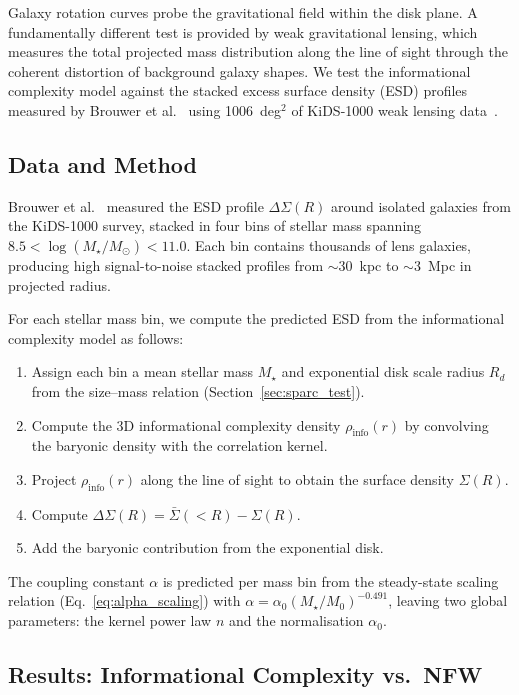 \documentclass[12pt,a4paper]{article}
\begin{document}
Galaxy rotation curves probe the gravitational field within the disk plane. A fundamentally different test is provided by weak gravitational lensing, which measures the total projected mass distribution along the line of sight through the coherent distortion of background galaxy shapes. We test the informational complexity model against the stacked excess surface density (ESD) profiles measured by Brouwer et al.~\cite{Brouwer2021} using 1006~deg$^2$ of KiDS-1000 weak lensing data~\cite{Lelli2016}.

\subsection{Data and Method}

Brouwer et al.~\cite{Brouwer2021} measured the ESD profile $\Delta\Sigma(R)$ around isolated galaxies from the KiDS-1000 survey, stacked in four bins of stellar mass spanning $8.5 < \log(M_\star/M_\odot) < 11.0$. Each bin contains thousands of lens galaxies, producing high signal-to-noise stacked profiles from $\sim 30$~kpc to $\sim 3$~Mpc in projected radius.

For each stellar mass bin, we compute the predicted ESD from the informational complexity model as follows:
\begin{enumerate}
    \item Assign each bin a mean stellar mass $M_\star$ and exponential disk scale radius $R_d$ from the size--mass relation (Section~\ref{sec:sparc_test}).
    \item Compute the 3D informational complexity density $\rho_{\mathrm{info}}(r)$ by convolving the baryonic density with the correlation kernel.
    \item Project $\rho_{\mathrm{info}}(r)$ along the line of sight to obtain the surface density $\Sigma(R)$.
    \item Compute $\Delta\Sigma(R) = \bar{\Sigma}(<R) - \Sigma(R)$.
    \item Add the baryonic contribution from the exponential disk.
\end{enumerate}

The coupling constant $\alpha$ is predicted per mass bin from the steady-state scaling relation (Eq.~\ref{eq:alpha_scaling}) with $\alpha = \alpha_0 (M_\star / M_0)^{-0.491}$, leaving two global parameters: the kernel power law $n$ and the normalisation $\alpha_0$.

\subsection{Results: Informational Complexity vs.\ NFW}
\end{document}
